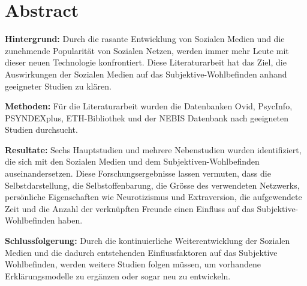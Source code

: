 %
%
\thispagestyle{empty} 
\chapter*{Abstract}\label{abstract}
\textbf{Hintergrund:} Durch die rasante Entwicklung von Sozialen Medien und die zunehmende Popularität von Sozialen Netzen, werden immer mehr Leute mit dieser neuen Technologie konfrontiert. Diese Literaturarbeit hat das Ziel, die Auswirkungen der Sozialen Medien auf das Subjektive-Wohlbefinden anhand geeigneter Studien zu klären. \par 
\textbf{Methoden:} Für die Literaturarbeit wurden die Datenbanken Ovid, PsycInfo, PSYNDEXplus, ETH-Bibliothek und der NEBIS Datenbank nach geeigneten Studien durchsucht.\par 
\textbf{Resultate:} Sechs Hauptstudien und mehrere Nebenstudien wurden identifiziert, die sich mit den Sozialen Medien und dem Subjektiven-Wohlbefinden auseinandersetzen. Diese Forschungsergebnisse lassen vermuten, dass die Selbstdarstellung, die Selbstoffenbarung, die Grösse des verwendeten Netzwerks, persönliche Eigenschaften wie Neurotizismus und Extraversion, die aufgewendete Zeit und die Anzahl der verknüpften Freunde einen Einfluss auf das Subjektive-Wohlbefinden haben.\par 
\textbf{Schlussfolgerung:} Durch die kontinuierliche Weiterentwicklung der Sozialen Medien und die dadurch entstehenden Einflussfaktoren auf das Subjektive Wohlbefinden, werden weitere Studien folgen müssen, um vorhandene Erklärungsmodelle zu ergänzen oder sogar neu zu entwickeln.\par 

